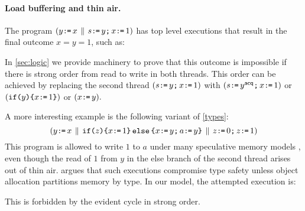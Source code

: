 \paragraph{Load buffering and thin air.}
The program
\begin{math}
  (y\texttt{:}\mkern-1mu\texttt{=}\, x \,\mathbin{\|}\, s\texttt{:}\mkern-1mu\texttt{=}\, y\texttt{;}\, x\texttt{:}\mkern-1mu\texttt{=}\,1)
\end{math}
has top level executions that result in the final outcome $x = y = 1$, such as:
\begin{tikzdisplay}[node distance=1em]
\end{tikzdisplay}
In \textsection\ref{sec:logic} we provide machinery to prove that this
outcome is impossible if there is strong order from read to write in both
threads.  This order can be achieved by replacing the second thread
\begin{math}
  (s\texttt{:}\mkern-1mu\texttt{=}\, y\texttt{;}\, x\texttt{:}\mkern-1mu\texttt{=}\,1)
\end{math}
with 
\begin{math}
  (s\texttt{:}\mkern-1mu\texttt{=}\, y^{\mathsf{acq}}\texttt{;}\, x\texttt{:}\mkern-1mu\texttt{=}\,1)
\end{math}
or
\begin{math}
  (\texttt{if}\allowbreak\texttt{(}y\texttt{)}\allowbreak\texttt{\{} x\texttt{:}\mkern-1mu\texttt{=}\, 1\texttt{\}})
\end{math}
or
\begin{math}
  (x\texttt{:}\mkern-1mu\texttt{=}\, y).
\end{math}

A more interesting example is the following variant of \eqref{types}:
\begin{equation}
  \label{alan}
  (
    y\texttt{:}\mkern-1mu\texttt{=}\, x
  \,\mathbin{\|}\,
    \texttt{if}\allowbreak\texttt{(}z\texttt{)}\allowbreak\texttt{\{} x\texttt{:}\mkern-1mu\texttt{=}\,1 \texttt{\}}\,\allowbreak\texttt{else}\allowbreak\,\texttt{\{} x\texttt{:}\mkern-1mu\texttt{=}\, y\texttt{;}\, a\texttt{:}\mkern-1mu\texttt{=}\, y \texttt{\}}
  \,\mathbin{\|}\,
    z\texttt{:}\mkern-1mu\texttt{=}\,0\texttt{;}\, z\texttt{:}\mkern-1mu\texttt{=}\,1
  )
\end{equation}
This program is allowed to write $1$ to $a$ under many speculative
memory models
\cite{Manson:2005:JMM:1047659.1040336,DBLP:conf/esop/JagadeesanPR10,DBLP:conf/popl/KangHLVD17},
even though the read of $1$ from $y$ in the else branch of the second
thread arises out of thin air.   \citet{DBLP:journals/toplas/Lochbihler13}
argues that such executions compromise type safety unless object allocation
partitions memory by type.
In our model, the attempted execution is:
\begin{tikzdisplay}[node distance=1em]
\end{tikzdisplay}
This is forbidden by the evident cycle in strong order.

